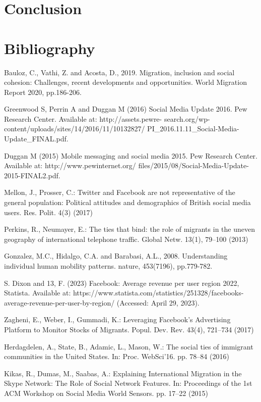 \documentclass[12pt]{article}
\begin{document}
\section{Conclusion}

\pagebreak 
\section{Bibliography}

Bauloz, C., Vathi, Z. and Acosta, D., 2019. Migration, inclusion and social cohesion: Challenges, recent developments and opportunities. World Migration Report 2020, pp.186-206.

Greenwood S, Perrin A and Duggan M (2016) Social Media Update
2016. Pew Research Center. Available at: http://assets.pewre-
search.org/wp-content/uploads/sites/14/2016/11/10132827/
PI_2016.11.11_Social-Media-Update_FINAL.pdf.

Duggan M (2015) Mobile messaging and social media 2015. Pew
Research Center. Available at: http://www.pewinternet.org/
files/2015/08/Social-Media-Update-2015-FINAL2.pdf.

Mellon, J., Prosser, C.: Twitter and Facebook are not representative of the general
population: Political attitudes and demographics of British social media users. Res.
Polit. 4(3) (2017)

Perkins, R., Neumayer, E.: The ties that bind: the role of migrants in the uneven
geography of international telephone traffic. Global Netw. 13(1), 79–100 (2013)

Gonzalez, M.C., Hidalgo, C.A. and Barabasi, A.L., 2008. Understanding individual human mobility patterns. nature, 453(7196), pp.779-782.

S. Dixon and 13, F. (2023) Facebook: Average revenue per user region 2022, Statista. Available at: https://www.statista.com/statistics/251328/facebooks-average-revenue-per-user-by-region/ (Accessed: April 29, 2023). 

Zagheni, E., Weber, I., Gummadi, K.: Leveraging Facebook’s Advertising Platform
to Monitor Stocks of Migrants. Popul. Dev. Rev. 43(4), 721–734 (2017)

Herdagdelen, A., State, B., Adamic, L., Mason, W.: The social ties of immigrant
communities in the United States. In: Proc. WebSci’16. pp. 78–84 (2016)

Kikas, R., Dumas, M., Saabas, A.: Explaining International Migration in the Skype
Network: The Role of Social Network Features. In: Proceedings of the 1st ACM
Workshop on Social Media World Sensors. pp. 17–22 (2015)
\end{document}
